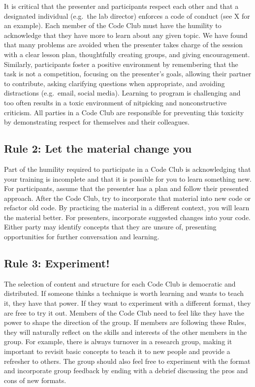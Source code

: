 \documentclass[
  11pt,
]{article}
\begin{document}
It is critical that the presenter and participants respect each other
and that a designated individual (e.g.~the lab director) enforces a code
of conduct (see X for an example). Each member of the Code Club must
have the humility to acknowledge that they have more to learn about any
given topic. We have found that many problems are avoided when the
presenter takes charge of the session with a clear lesson plan,
thoughtfully creating groups, and giving encouragement. Similarly,
participants foster a positive environment by remembering that the task
is not a competition, focusing on the presenter's goals, allowing their
partner to contribute, asking clarifying questions when appropriate, and
avoiding distractions (e.g.~email, social media). Learning to program is
challenging and too often results in a toxic environment of nitpicking
and nonconstructive criticism. All parties in a Code Club are
responsible for preventing this toxicity by demonstrating respect for
themselves and their colleagues.

\hypertarget{rule-2-let-the-material-change-you}{%
\subsection{Rule 2: Let the material change
you}\label{rule-2-let-the-material-change-you}}

Part of the humility required to participate in a Code Club is
acknowledging that your training is incomplete and that it is possible
for you to learn something new. For participants, assume that the
presenter has a plan and follow their presented approach. After the Code
Club, try to incorporate that material into new code or refactor old
code. By practicing the material in a different context, you will learn
the material better. For presenters, incorporate suggested changes into
your code. Either party may identify concepts that they are unsure of,
presenting opportunities for further conversation and learning.

\hypertarget{rule-3-experiment}{%
\subsection{Rule 3: Experiment!}\label{rule-3-experiment}}

The selection of content and structure for each Code Club is democratic
and distributed. If someone thinks a technique is worth learning and
wants to teach it, they have that power. If they want to experiment with
a different format, they are free to try it out. Members of the Code
Club need to feel like they have the power to shape the direction of the
group. If members are following these Rules, they will naturally reflect
on the skills and interests of the other members in the group. For
example, there is always turnover in a research group, making it
important to revisit basic concepts to teach it to new people and
provide a refresher to others. The group should also feel free to
experiment with the format and incorporate group feedback by ending with
a debrief discussing the pros and cons of new formats.
\end{document}
